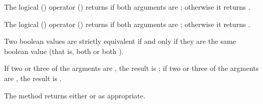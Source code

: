 
The logical  () operator \EXP{\nand} () returns  if both arguments are ;
otherwise it returns .



The logical  () operator \EXP{\nor} () returns  if both arguments are ;
otherwise it returns .



Two boolean values are strictly equivalent if and only if they are the same
boolean value
(that is, both  or both ).



If two or three of the argments are , the result is ;
if two or three of the argments are , the result is .



The  method returns either 
or  as appropriate.







